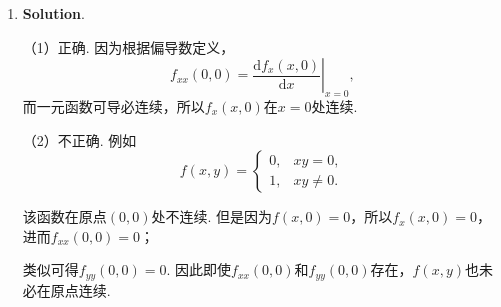 \documentclass[../Main.tex]{subfiles}
\begin{document}
\begin{enumerate}
    \item \textbf{Solution}.

          （1）正确. 因为根据偏导数定义，
          \[
              f_{xx}(0,0)=\left.\frac{\mathrm{d}f_{x}(x,0)}{\mathrm{d}x}\right|_{x=0},
          \]
          而一元函数可导必连续，所以$f_{x}(x,0)$在$x=0$处连续.

          （2）不正确. 例如
          \[
              f(x,y)=
              \begin{cases}
                  0, & xy=0,    \\
                  1, & xy\neq0.
              \end{cases}
          \]

          该函数在原点$(0,0)$处不连续. 但是因为$f(x,0)=0$，所以$f_{x}(x,0)=0$，进而$f
                  _{xx}(0,0)=0$；

          类似可得$f_{yy}(0,0)=0$. 因此即使$f_{xx}(0,0)$和$f_{yy}(0,0)$存在，$f(x,y)$也未必在原点连续.
\end{enumerate}
\end{document}
